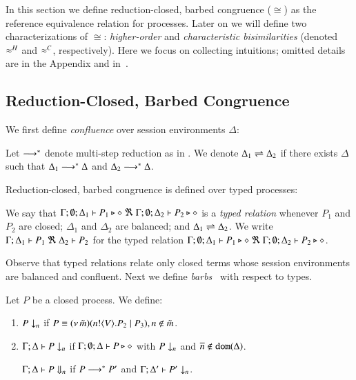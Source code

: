 \noi In this section we define reduction-closed, barbed congruence ($\cong$) as the
reference equivalence relation for \HOp processes.
Later on we will define two characterizations of $\cong$:
\emph{higher-order} and  
\emph{characteristic bisimilarities} (denoted $\approx^H$ and $\approx^C$, respectively). 
Here we focus on collecting intuitions; omitted details are in the Appendix and in~\cite{KouzapasPY15}.

\subsection{Reduction-Closed, Barbed Congruence}
\label{subsec:rc}
We first define \emph{confluence} over session environments $\Delta$:

\begin{definition}
Let $\longrightarrow^\ast$ denote multi-step reduction as in .
	We denote $\Delta_1 \rightleftharpoons \Delta_2$ if there exists $\Delta$ such that
	$\Delta_1 \longrightarrow^\ast \Delta$ and $\Delta_2 \longrightarrow^\ast \Delta$.
\end{definition}

\noi Reduction-closed, barbed congruence is defined over typed
processes:

\begin{definition}
	We say that
	$\Gamma; \emptyset; \Delta_1 \vdash P_1 \triangleright \diamond\ \Re \ \Gamma; \emptyset; \Delta_2 \vdash P_2 \triangleright \diamond$
	is a {\em typed relation} whenever
	$P_1$ and $P_2$ are closed;
	$\Delta_1$ and $\Delta_2$ are balanced; and 
	$\Delta_1 \rightleftharpoons \Delta_2$.
	We write $\horel{\Gamma}{\Delta_1}{P_1}{\ \Re \ }{\Delta_2}{P_2}$
	for the typed relation $\Gamma; \emptyset; \Delta_1 \vdash P_1 \triangleright \diamond\ \Re \ \Gamma; \emptyset; \Delta_2 \vdash P_2 \triangleright \diamond$.
\end{definition}


\noi Observe that typed relations relate only closed terms whose
session environments %
are balanced  and confluent.
Next we define  {\em barbs}~\cite{MiSa92}
with respect to types. 


\begin{definition}[Barbs]\rm
	Let $P$ be a closed process. We define:
	\begin{enumerate}
		\item	$P \downarrow_{n}$ if $P \equiv (\nu\, \tilde{m})(n ! \langle V \rangle . P_2 \;|\; P_3), n \notin \tilde{m}$. %

		\item	$\Gamma; \Delta \vdash P \downarrow_{n}$ if
			$\Gamma; \emptyset; \Delta \vdash P \triangleright \diamond$ with $P \downarrow_{n}$ and $\overline{n} \notin \mathtt{dom}(\Delta)$.

			$\Gamma; \Delta \vdash P \Downarrow_{n}$ if $P \longrightarrow^* P'$ and
			$\Gamma; \Delta' \vdash P' \downarrow_{n}$.			
	\end{enumerate}
\end{definition}


